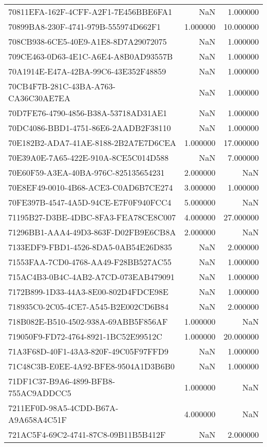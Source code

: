 \begin{tabular}{lrr}
70811EFA-162F-4CFF-A2F1-7E456BBE6FA1 & NaN & 1.000000 \\
70899BA8-230F-4741-979B-555974D662F1 & 1.000000 & 10.000000 \\
708CB938-6CE5-40E9-A1E8-8D7A29072075 & NaN & 1.000000 \\
709CE463-0D63-4E1C-A6E4-A8B0AD93557B & NaN & 1.000000 \\
70A1914E-E47A-42BA-99C6-43E352F48859 & NaN & 1.000000 \\
70CB4F7B-281C-43BA-A763-CA36C30AE7EA & NaN & 1.000000 \\
70D7FE76-4790-4856-B38A-53718AD31AE1 & NaN & 1.000000 \\
70DC4086-BBD1-4751-86E6-2AADB2F38110 & NaN & 1.000000 \\
70E182B2-ADA7-41AE-8188-2B2A7E7D6CEA & 1.000000 & 17.000000 \\
70E39A0E-7A65-422E-910A-8CE5C014D588 & NaN & 7.000000 \\
70E60F59-A3EA-40BA-976C-825135654231 & 2.000000 & NaN \\
70E8EF49-0010-4B68-ACE3-C0AD6B7CE274 & 3.000000 & 1.000000 \\
70FE397B-4547-4A5D-94CE-E7F0F940FCC4 & 5.000000 & NaN \\
71195B27-D3BE-4DBC-8FA3-FEA78CE8C007 & 4.000000 & 27.000000 \\
71296BB1-AAA4-49D3-863F-D02FB9E6CB8A & 2.000000 & NaN \\
7133EDF9-FBD1-4526-8DA5-0AB54E26D835 & NaN & 2.000000 \\
71553FAA-7CD0-4768-AA49-F28BB527AC55 & NaN & 1.000000 \\
715AC4B3-0B4C-4AB2-A7CD-073EAB479091 & NaN & 1.000000 \\
7172B899-1D33-44A3-8E00-802D4FDCE98E & NaN & 1.000000 \\
718935C0-2C05-4CE7-A545-B2E002CD6B84 & NaN & 2.000000 \\
718B082E-B510-4502-938A-69ABB5F856AF & 1.000000 & NaN \\
719050F9-FD72-4764-8921-1BC52E99512C & 1.000000 & 20.000000 \\
71A3F68D-40F1-43A3-820F-49C05F97FFD9 & NaN & 1.000000 \\
71C48C3B-E0EE-4A92-BFE8-9504A1D3B6B0 & NaN & 1.000000 \\
71DF1C37-B9A6-4899-BFB8-755AC9ADDCC5 & 1.000000 & NaN \\
7211EF0D-98A5-4CDD-B67A-A9A658A4C51F & 4.000000 & NaN \\
721AC5F4-69C2-4741-87C8-09B11B5B412F & NaN & 2.000000 \\

\end{tabular}

